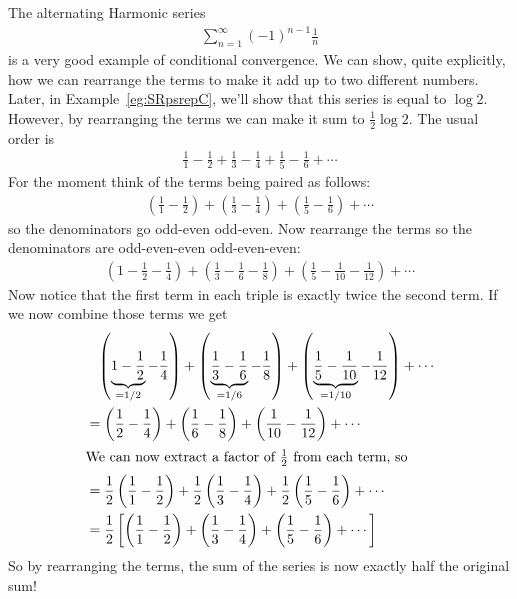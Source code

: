 \begin{eg}
 The alternating Harmonic series
\begin{align*}
  \sum_{n=1}^ \infty (-1)^{n-1} \frac{1}{n}
\end{align*}
is a very good example of conditional convergence. We can show,
quite explicitly, how we can rearrange the terms to make it add up
to two different numbers. Later, in Example~\ref{eg:SRpsrepC}, we'll
show that this series is equal to $\log 2$. However, by rearranging the
terms we can make it sum to $\frac{1}{2}\log 2$. The usual order is
\begin{align*}
\frac{1}{1} - \frac{1}{2} + \frac{1}{3} - \frac{1}{4} + \frac{1}{5} - \frac{1}{6} + \cdots
\end{align*}
For the moment think of the terms being paired as follows:
\begin{align*}
  \left(\frac{1}{1} - \frac{1}{2}\right)
  + \left(\frac{1}{3} - \frac{1}{4}\right)
  + \left(\frac{1}{5} - \frac{1}{6}\right)
  + \cdots
\end{align*}
so the denominators go odd-even odd-even. Now rearrange the terms so the denominators are odd-even-even
odd-even-even:
\begin{align*}
  \left( 1 - \frac{1}{2}-\frac{1}{4} \right)
  + \left(\frac{1}{3} - \frac{1}{6} - \frac{1}{8} \right)
  + \left(\frac{1}{5} - \frac{1}{10} - \frac{1}{12} \right)
  + \cdots
\end{align*}
Now notice that the first term in each triple is exactly twice
the second term. If we now combine those terms we get
\begin{align*}
  &\phantom{=}\left( \underbrace{1 - \frac{1}{2}}_{=1/2} -\frac{1}{4} \right)
  + \left(\underbrace{\frac{1}{3} - \frac{1}{6}}_{=1/6} - \frac{1}{8} \right)
  + \left(\underbrace{\frac{1}{5} - \frac{1}{10}}_{=1/10} - \frac{1}{12} \right)
  + \cdots
  \\
  &=
  \left( \frac{1}{2}-\frac{1}{4} \right)
  + \left( \frac{1}{6} - \frac{1}{8} \right)
  + \left(\frac{1}{10} - \frac{1}{12} \right)
  + \cdots \\
  \intertext{We can now extract a factor of $\frac{1}{2}$ from each term, so}
  &= \frac{1}{2}
  \left( \frac{1}{1}-\frac{1}{2} \right)
  + \frac{1}{2}\left( \frac{1}{3} - \frac{1}{4} \right)
  + \frac{1}{2}\left(\frac{1}{5} - \frac{1}{6} \right)
  + \cdots \\
  &= \frac{1}{2} \left[
  \left(\frac{1}{1} - \frac{1}{2}\right)
  + \left(\frac{1}{3} - \frac{1}{4}\right)
  + \left(\frac{1}{5} - \frac{1}{6}\right)
  + \cdots
  \right]
\end{align*}
So by rearranging the terms, the sum of the series is now exactly half
the original sum!
\end{eg}


